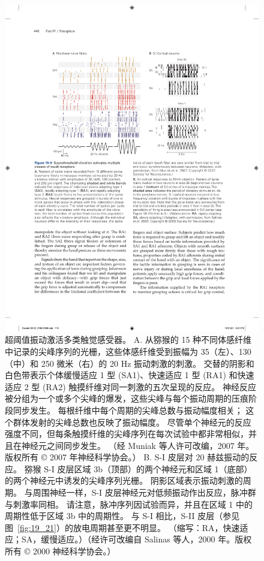 \begin{figure}[htbp]
	\centering
	\includegraphics[width=1.0\linewidth]{chap19/fig_19_9}
	\caption{超阈值振动激活多类触觉感受器。 
		A. 从猕猴的 15 种不同体感纤维中记录的尖峰序列的光栅，这些体感纤维受到振幅为 35（左）、130（中）和 250 微米（右）的 20 Hz 振动刺激的刺激。
		交替的阴影和白色带表示个体缓慢适应 1 型 (SA1)、快速适应 1 型 (RA1) 和快速适应 2 型 (RA2) 触摸纤维对同一刺激的五次呈现的反应。
		神经反应被分组为一个或多个尖峰的爆发，这些尖峰与每个振动周期的压痕阶段同步发生。
		每根纤维中每个周期的尖峰总数与振动幅度相关； 这个群体发射的尖峰总数也反映了振动幅度。
		尽管单个神经元的反应强度不同，但每条触摸纤维的尖峰序列在每次试验中都非常相似，并且在神经元之间同步发生。 （经 Muniak 等人许可改编，2007 年。版权所有 © 2007 年神经科学协会。）
		B. S-I 皮层对 20 赫兹振动的反应。 猕猴 S-I 皮层区域 3b（顶部）的两个神经元和区域 1（底部）的两个神经元中诱发的尖峰序列光栅。
		阴影区域表示振动刺激的周期。
		与周围神经一样，S-I 皮层神经元对低频振动作出反应，脉冲群与刺激率同相。
		请注意，脉冲序列因试验而异，并且在区域 1 中的周期性低于区域 3b 中的周期性。
		与 S-I 相比，S-II 皮层（参见图~\ref{fig:19_21}）的放电周期甚至更不明显。 （缩写：RA，快速适应；SA，缓慢适应。）（经许可改编自 Salinas 等人，2000 年。版权所有 © 2000 神经科学协会。）}
	\label{fig:19_9}
\end{figure}


